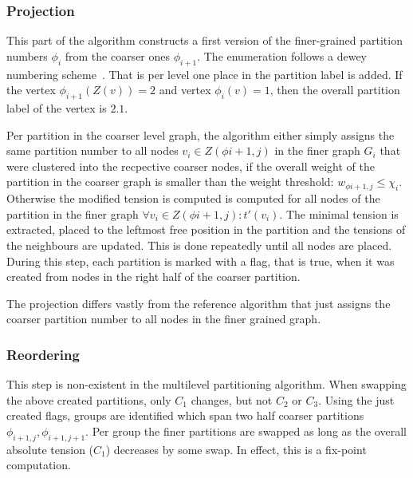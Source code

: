         \subsubsection*{Projection}
        This part of the algorithm constructs a first version of the finer-grained partition numbers $\phi_i$ from the coarser ones $\phi_{i + 1}$.
        The enumeration follows a dewey numbering scheme~\autocite{dewey1894decimal}.
        That is per level one place in the partition label is added. 
        If the vertex $\phi_{i+1}(Z(v)) = 2$ and vertex $\phi_i(v) = 1$, then the overall partition label of the vertex is $2\text{.}1$. 
        
        Per partition in the coarser level graph, the algorithm either simply assigns the same partition number to all nodes $v_i \in Z(\phi{i+1,j})$ in the finer graph $G_i$ that were clustered into the recpective coarser nodes, if the overall weight of the partition in the coarser graph is smaller than the weight threshold: $w_{\phi{i+1, j}} \leq \chi_i$.
        Otherwise the modified tension is computed is computed for all nodes of the partition in the finer graph $\forall v_i \in Z(\phi{i+1,j}): t'(v_i)$.
        The minimal tension is extracted, placed to the leftmost free position in the partition and the tensions of the neighbours are updated. 
        This is done repeatedly until all nodes are placed.
        During this step, each partition is marked with a flag, that is true, when it was created from nodes in the right half of the coarser partition.
        
        The projection differs vastly from the reference algorithm that just assigns the coarser partition number to all nodes in the finer grained graph.
                
        \subsubsection*{Reordering}
        This step is non-existent in the multilevel partitioning algorithm.
        When swapping the above created partitions, only $C_1$ changes, but not $C_2$ or $C_3$. Using the just created flags, groups are identified which span two half coarser partitions $\phi_{i+1,j}, \phi_{i+1,j+1}$. Per group the finer partitions are swapped as long as the overall absolute tension ($C_1$) decreases by some swap.
        In effect, this is a fix-point computation.
        

